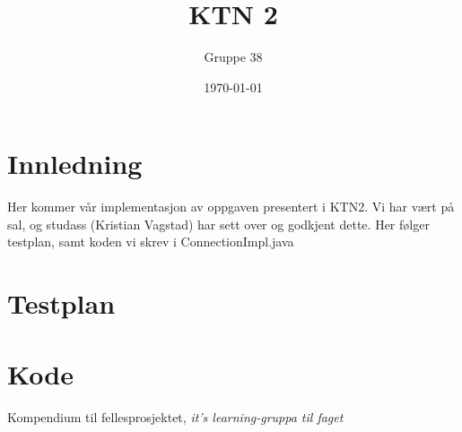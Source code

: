 \documentclass[titlepage]{article}
\author{Gruppe 38}
\title{KTN 2}
\date{\today}
\begin{document}
\maketitle

\tableofcontents

\newpage
\section{Innledning}
Her kommer vår implementasjon av oppgaven presentert i KTN2. Vi har vært på sal, og studass (Kristian Vagstad) har sett over og godkjent dette. Her følger testplan, samt koden vi skrev i ConnectionImpl.java

\newpage
\section{Testplan}


\newpage
\section{Kode}


\newpage
\begin{thebibliography}{9}

	Kompendium til fellesprosjektet,
	\emph{it's learning-gruppa til faget}
\end{thebibliography}
\end{document}
